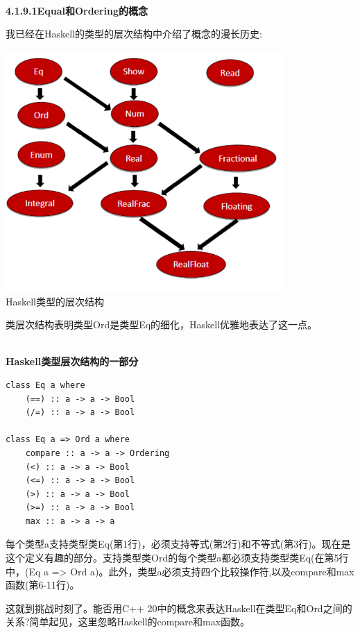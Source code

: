 \hspace*{\fill} \\ %
\noindent
\textbf{4.1.9.1\hspace{0.2cm}Equal和Ordering的概念}

我已经在Haskell的类型的层次结构中介绍了概念的漫长历史:

\begin{center}
\includegraphics[width=0.8\textwidth]{content/3/chapter4/images/9.png}\\
Haskell类型的层次结构
\end{center}

类层次结构表明类型Ord是类型Eq的细化，Haskell优雅地表达了这一点。

\hspace*{\fill} \\ %
\noindent
\textbf{Haskell类型层次结构的一部分}
\begin{lstlisting}[style=styleCXX]
class Eq a where
	(==) :: a -> a -> Bool
	(/=) :: a -> a -> Bool

class Eq a => Ord a where
	compare :: a -> a -> Ordering
	(<) :: a -> a -> Bool
	(<=) :: a -> a -> Bool
	(>) :: a -> a -> Bool
	(>=) :: a -> a -> Bool
	max :: a -> a -> a
\end{lstlisting}

每个类型a支持类型类Eq(第1行)，必须支持等式(第2行)和不等式(第3行)。现在是这个定义有趣的部分。支持类型类Ord的每个类型a都必须支持类型类Eq(在第5行中，(Eq a => Ord a)。此外，类型a必须支持四个比较操作符,以及compare和max函数(第6-11行)。

这就到挑战时刻了。能否用C++ 20中的概念来表达Haskell在类型Eq和Ord之间的关系?简单起见，这里忽略Haskell的compare和max函数。

